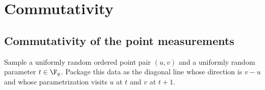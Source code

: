\chapter{Commutativity}
\label{chap:commutativity}
\label{sec:g-comm}

\section{Commutativity of the point measurements}
\label{sec:commutativity-points}

\begin{definition}\label{def:point-pair-shared-diagonal-line-distribution}
	\leanok
	Sample a uniformly random ordered point pair $(u,v)$ and a uniformly random
	parameter $t \in \F_q$. Package this data as the diagonal line whose direction
	is $v-u$ and whose parametrization visits $u$ at $t$ and $v$ at $t+1$.
\end{definition}

